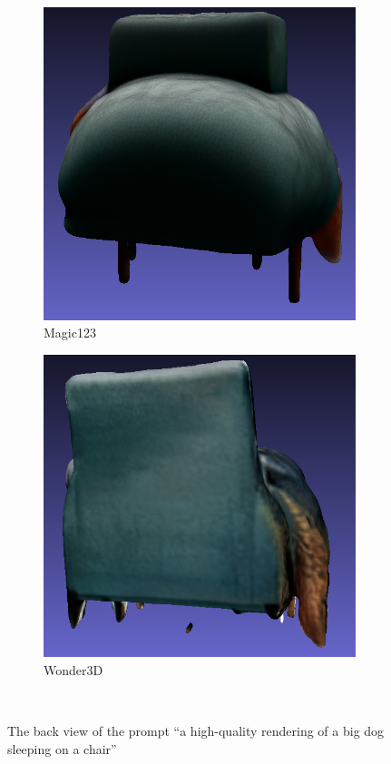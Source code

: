 \begin{figure}[ht]
    \begin{subfigure}[b]{0.261\textwidth}
        \centering
        \includegraphics[width=\textwidth]{figures/subjective/magic123_dog_back_result.png}
        \caption{Magic123}
        \vspace{0.1cm}
    \end{subfigure}
    \begin{subfigure}[b]{0.27\textwidth}
        \centering
        \includegraphics[width=\textwidth]{figures/subjective/wonder3D_dog_back_result.png}
        \caption{Wonder3D}
        \vspace{0.1cm}
    \end{subfigure}
    \caption{The back view of the prompt ``a high-quality rendering of a big dog sleeping on a chair''}~\label{fig:resultDogBack}
\end{figure}

